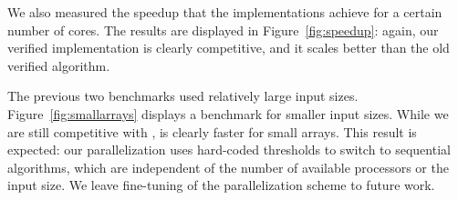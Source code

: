 \documentclass[sn-mathphys,Numbered]{sn-jnl}
\theoremstyle{thmstyleone}%
\theoremstyle{definition}%
\theoremstyle{thmstylethree}%
\begin{document}
%
%

  We also measured the speedup that the implementations achieve for a certain number of cores.
  The results are displayed in Figure~\ref{fig:speedup}: again, our verified implementation is clearly competitive, and it scales better than the old verified algorithm.

  The previous two benchmarks used relatively large input sizes.
  Figure~\ref{fig:smallarrays} displays a benchmark for smaller input sizes. While we are still competitive with ,
   is clearly faster for small arrays. This result is expected: our parallelization uses hard-coded thresholds
  to switch to sequential algorithms, which are independent of the number of available processors or the input size.
  We leave fine-tuning of the parallelization scheme to future work.


%
%
%
\end{document}
